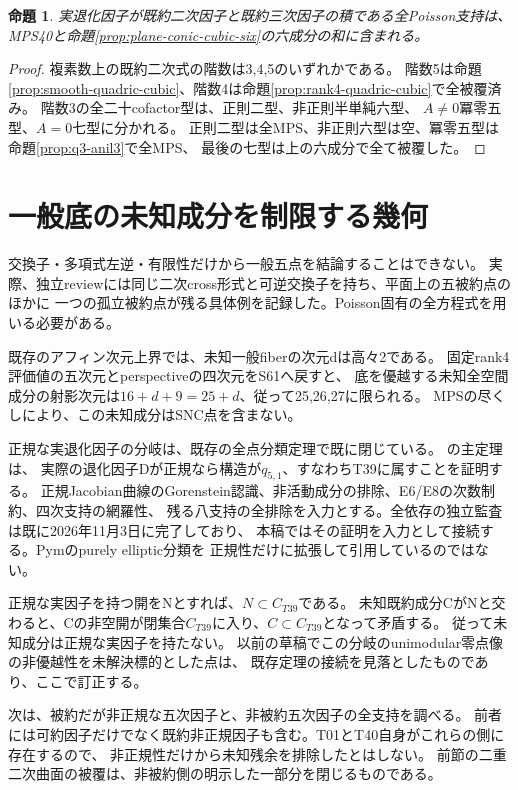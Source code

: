 \documentclass[a4paper,11pt]{ltjsarticle}
\newtheorem{proposition}{命題}[section]
\theoremstyle{definition}
\begin{document}
\begin{proposition}\label{prop:quadric-cubic-all}
実退化因子が既約二次因子と既約三次因子の積である全Poisson支持は、
MPS40と命題\ref{prop:plane-conic-cubic-six}の六成分の和に含まれる。
\end{proposition}
\begin{proof}
複素数上の既約二次式の階数は3,4,5のいずれかである。
階数5は命題\ref{prop:smooth-quadric-cubic}、階数4は命題\ref{prop:rank4-quadric-cubic}で全被覆済み。
階数3の全二十cofactor型は、正則二型、非正則半単純六型、
$A\ne0$冪零五型、$A=0$七型に分かれる。
正則二型は全MPS、非正則六型は空、冪零五型は命題\ref{prop:q3-anil3}で全MPS、
最後の七型は上の六成分で全て被覆した。
\end{proof}

\section{一般底の未知成分を制限する幾何}
交換子・多項式左逆・有限性だけから一般五点を結論することはできない。
実際、独立reviewには同じ二次cross形式と可逆交換子を持ち、平面上の五被約点のほかに
一つの孤立被約点が残る具体例を記録した。Poisson固有の全方程式を用いる必要がある。

既存のアフィン次元上界では、未知一般fiberの次元dは高々2である。
固定rank4評価値の五次元とperspectiveの四次元をS61へ戻すと、
底を優越する未知全空間成分の射影次元は$16+d+9=25+d$、従って25,26,27に限られる。
MPSの尽くしにより、この未知成分はSNC点を含まない。

正規な実退化因子の分岐は、既存の全点分類定理で既に閉じている。
の主定理は、
実際の退化因子Dが正規なら構造が$q_{5,1}$、すなわちT39に属すことを証明する。
正規Jacobian曲線のGorenstein認識、非活動成分の排除、E6/E8の次数制約、四次支持の網羅性、
残る八支持の全排除を入力とする。全依存の独立監査は既に2026年11月3日に完了しており、
本稿ではその証明を入力として接続する。Pymのpurely elliptic分類\cite{pymelliptic}を
正規性だけに拡張して引用しているのではない。

正規な実因子を持つ開をNとすれば、$N\subset C_{T39}$である。
未知既約成分CがNと交わると、Cの非空開が閉集合$C_{T39}$に入り、$C\subset C_{T39}$となって矛盾する。
従って未知成分は正規な実因子を持たない。
以前の草稿でこの分岐のunimodular零点像の非優越性を未解決標的とした点は、
既存定理の接続を見落としたものであり、ここで訂正する。

次は、被約だが非正規な五次因子と、非被約五次因子の全支持を調べる。
前者には可約因子だけでなく既約非正規因子も含む。T01とT40自身がこれらの側に存在するので、
非正規性だけから未知残余を排除したとはしない。
前節の二重二次曲面の被覆は、非被約側の明示した一部分を閉じるものである。
\end{document}
